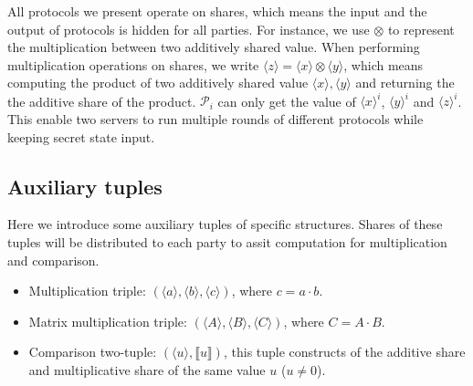 \documentclass[letterpaper]{article} %
\begin{document}
    All protocols we present operate on shares, which means
    the input and the output of protocols is hidden for all parties.
    For instance, we use $\otimes$ to represent the multiplication between two additively shared value.
    When performing multiplication operations on shares,
    we write $\langle z\rangle=\langle x\rangle\otimes  \langle y\rangle $,
    which means computing the product of two additively shared value $\langle x\rangle, \langle y\rangle$ and returning the
    the additive share of the product.
    $\mathcal{P}_{i}$ can only get the value of $\langle x\rangle ^{i}$, $\langle y\rangle ^{i}$ and $\langle z\rangle ^{i}$.
    This enable two servers to run multiple rounds of different protocols
    while keeping secret state input.

    \subsection{Auxiliary tuples}
    Here we introduce some auxiliary tuples of specific structures.
    Shares of these tuples will be distributed to each party to
    assit computation for multiplication and comparison.
    \begin{itemize}
        \item Multiplication triple: $(\langle a\rangle,\langle b\rangle,\langle c\rangle)$, where $c=a\cdot b$.
        \item Matrix multiplication triple: $(\langle A\rangle,\langle B\rangle,\langle C\rangle)$, where $C=A\cdot B$.
        \item Comparison two-tuple: $(\langle u\rangle,\llbracket u \rrbracket)$,
        this tuple constructs of the additive share and multiplicative share of the same value $u$ ($u\neq 0 $).
    \end{itemize}
\end{document}
